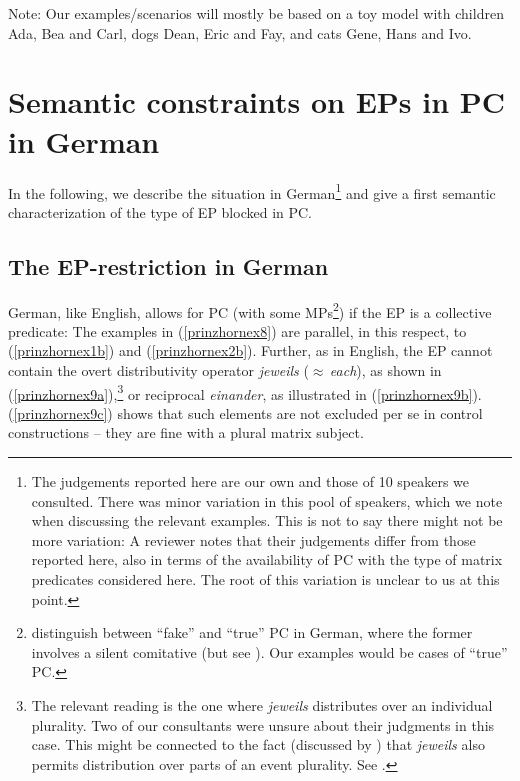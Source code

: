 \documentclass[output=paper,colorlinks,citecolor=brown,
]{langscibook}
\begin{document}
Note: Our examples/scenarios will mostly be based on a toy model with children Ada, Bea and Carl, dogs Dean, Eric and Fay, and cats Gene, Hans and Ivo. 



\section{Semantic constraints on EPs in PC in German}\label{prinzhornsec:2}

In the following, we describe the situation in German\footnote{The judgements reported here are our own and those of 10 speakers we consulted. There was minor variation in this pool of speakers, which we note when discussing the relevant examples. This is not to say there might not be more variation: A reviewer notes that their judgements differ from those reported here, also in terms of the availability of PC with the type of matrix predicates considered here. The root of this variation is unclear to us at this point.} and give a first semantic characterization of the type of EP blocked in PC.

\subsection{The EP-restriction in German}\label{prinzhornsec:2.1}

German, like English, allows for PC (with some MPs\footnote{\citet{Pitteroff:2017} distinguish between “fake” and “true” PC in German, where the former involves a silent comitative (but see \citealt{Landau:2016}). Our examples would be cases of “true” PC.}) if the EP is a collective predicate: The examples in (\ref{prinzhornex8}) are parallel, in this respect, to (\ref{prinzhornex1b}) and  (\ref{prinzhornex2b}). Further, as in English, the EP cannot contain the overt distributivity operator \textit{jeweils} ($\approx$\,\textit{each}), as shown in (\ref{prinzhornex9a}),\footnote{The relevant reading is the one where \textit{jeweils} distributes over an individual plurality. Two of our consultants were unsure about their judgments in this case. This might be connected to  the fact (discussed by \citealt{Zimmermann:2002}) that \textit{jeweils} also permits distribution over parts of an event plurality.  See .} or reciprocal \textit{einander}, as illustrated in (\ref{prinzhornex9b}). (\ref{prinzhornex9c}) shows that such elements are not excluded per se in control constructions -- they are fine with a plural matrix subject.
\end{document}
